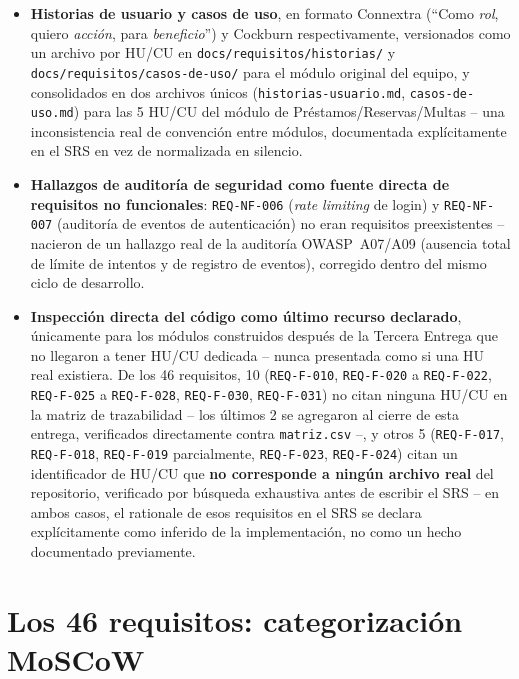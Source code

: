 \begin{itemize}[leftmargin=1.2cm]
  \item \textbf{Historias de usuario y casos de uso}, en formato
    Connextra (``Como \emph{rol}, quiero \emph{acción}, para
    \emph{beneficio}'') y Cockburn respectivamente, versionados como un
    archivo por HU/CU en \texttt{docs/requisitos/historias/} y
    \texttt{docs/requisitos/casos-de-uso/} para el módulo original del
    equipo, y consolidados en dos archivos únicos
    (\texttt{historias-usuario.md}, \texttt{casos-de-uso.md}) para las 5
    HU/CU del módulo de Préstamos/Reservas/Multas -- una inconsistencia
    real de convención entre módulos, documentada explícitamente en el
    SRS en vez de normalizada en silencio.
  \item \textbf{Hallazgos de auditoría de seguridad como fuente directa
    de requisitos no funcionales}: \texttt{REQ-NF-006} (\emph{rate
    limiting} de login) y \texttt{REQ-NF-007} (auditoría de eventos de
    autenticación) no eran requisitos preexistentes -- nacieron de un
    hallazgo real de la auditoría OWASP~A07/A09 (ausencia total de
    límite de intentos y de registro de eventos), corregido dentro del
    mismo ciclo de desarrollo.
  \item \textbf{Inspección directa del código como último recurso
    declarado}, únicamente para los módulos construidos después de la
    Tercera Entrega que no llegaron a tener HU/CU dedicada -- nunca
    presentada como si una HU real existiera. De los 46 requisitos, 10
    (\texttt{REQ-F-010}, \texttt{REQ-F-020} a \texttt{REQ-F-022},
    \texttt{REQ-F-025} a \texttt{REQ-F-028}, \texttt{REQ-F-030},
    \texttt{REQ-F-031}) no citan ninguna HU/CU en la
    matriz de trazabilidad -- los últimos 2 se agregaron al cierre de
    esta entrega, verificados directamente contra \texttt{matriz.csv} --,
    y otros 5
    (\texttt{REQ-F-017}, \texttt{REQ-F-018}, \texttt{REQ-F-019}
    parcialmente, \texttt{REQ-F-023}, \texttt{REQ-F-024}) citan un
    identificador de HU/CU que \textbf{no corresponde a ningún archivo
    real} del repositorio, verificado por búsqueda exhaustiva antes de
    escribir el SRS -- en ambos casos, el rationale de esos requisitos en
    el SRS se declara explícitamente como inferido de la implementación,
    no como un hecho documentado previamente.
\end{itemize}

\section{Los 46 requisitos: categorización MoSCoW}

